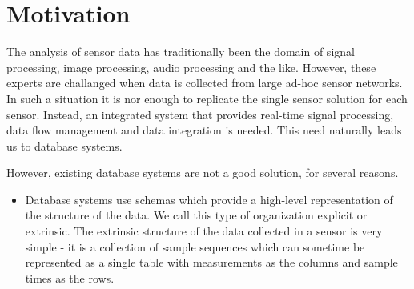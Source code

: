 \section{Motivation}

The analysis of sensor data has traditionally been the domain of
signal processing, image processing, audio processing and the
like. However, these experts are challanged when data is
collected from large ad-hoc sensor networks. In such a situation it is
nor enough to replicate the single sensor solution for each
sensor. Instead, an integrated system that provides real-time signal
processing, data flow management and data integration is needed. This
need naturally leads us to database systems.

However, existing database systems are not a good solution, for
several reasons.
\begin{itemize}
\item Database systems use schemas which provide a high-level
  representation of the structure of the data. We call this type of
  organization explicit or extrinsic. The extrinsic structure of the
  data collected in a sensor is very simple - it is a collection of
  sample sequences which can sometime be represented as a single table
  with measurements as the columns and sample times as the rows.
\end{itemize}
